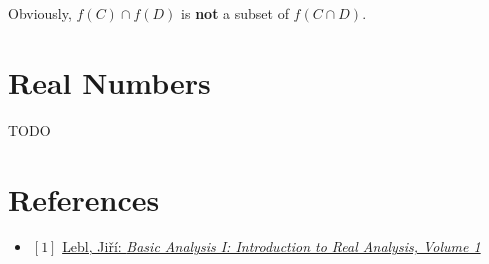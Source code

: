 \documentclass[12pt, letterpaper, oneside]{book}
\begin{document}
Obviously, $f(C) \cap f(D)$ is \textbf{not} a subset of $f(C \cap D)$.

%
%

\chapter{Real Numbers}

TODO

\chapter*{References}

\begin{itemize}
  \item $[1]$ \href{https://ocw.mit.edu/courses/18-100a-real-analysis-fall-2020/resources/mit18_100af20_basic_analysis/}{Lebl, Jiří: \it{Basic Analysis I: Introduction to Real Analysis, Volume 1}}
\end{itemize}
\end{document}
